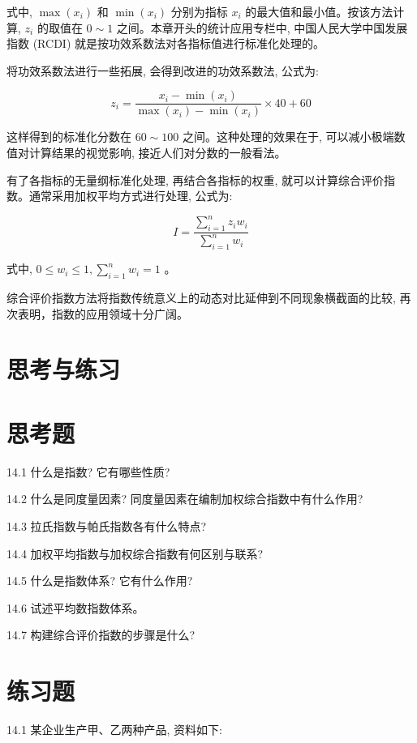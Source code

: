 \documentclass[10pt]{article}
\begin{document}
\begin{CJK*}{UTF8}{bsmi}
式中, $\max \left(x_{i}\right)$ 和 $\min \left(x_{i}\right)$ 分别为指标 $x_{i}$ 的最大值和最小值。按该方法计算, $z_{i}$ 的取值在 $0 \sim 1$ 之间。本章开头的统计应用专栏中, 中国人民大学中国发展指数 (RCDI) 就是按功效系数法对各指标值进行标准化处理的。

将功效系数法进行一些拓展, 会得到改进的功效系数法, 公式为:


\begin{equation*}
z_{i}=\frac{x_{i}-\min \left(x_{i}\right)}{\max \left(x_{i}\right)-\min \left(x_{i}\right)} \times 40+60 \tag{14.29}
\end{equation*}


这样得到的标准化分数在 $60 \sim 100$ 之间。这种处理的效果在于, 可以减小极端数值对计算结果的视觉影响, 接近人们对分数的一般看法。

有了各指标的无量纲标准化处理, 再结合各指标的权重, 就可以计算综合评价指数。通常采用加权平均方式进行处理, 公式为:


\begin{equation*}
I=\frac{\sum_{i=1}^{n} z_{i} w_{i}}{\sum_{i=1}^{n} w_{i}} \tag{14.30}
\end{equation*}


式中, $0 \leqslant w_{i} \leqslant 1, \sum_{i=1}^{n} w_{i}=1$ 。

综合评价指数方法将指数传统意义上的动态对比延伸到不同现象横截面的比较, 再次表明，指数的应用领域十分广阔。

\section*{思考与练习}
\section*{思考题}
14.1 什么是指数? 它有哪些性质?

14.2 什么是同度量因素? 同度量因素在编制加权综合指数中有什么作用?

14.3 拉氏指数与帕氏指数各有什么特点?

14.4 加权平均指数与加权综合指数有何区别与联系?

14.5 什么是指数体系? 它有什么作用?

14.6 试述平均数指数体系。

14.7 构建综合评价指数的步骤是什么?

\section*{练习题}
14.1 某企业生产甲、乙两种产品, 资料如下:


\end{CJK*}
\end{document}
